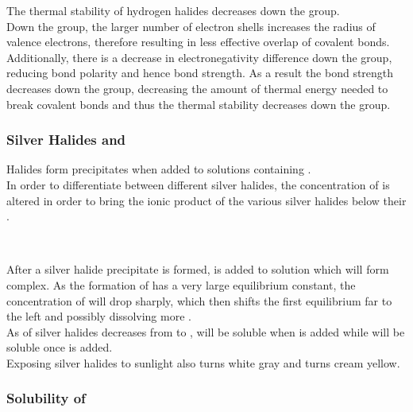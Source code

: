 \documentclass[../main]{subfiles}
\begin{document}
	The thermal stability of hydrogen halides decreases down the group. \\

	Down the group, the larger number of electron shells increases the radius of valence electrons, therefore resulting in less effective overlap of covalent bonds. Additionally, there is a decrease in electronegativity difference down the group, reducing bond polarity and hence bond strength. As a result the  bond strength decreases down the group, decreasing the amount of thermal energy needed to break covalent bonds and thus the thermal stability decreases down the group.

	\subsubsection{Silver Halides and }

	Halides form precipitates when added to solutions containing . \\

	In order to differentiate between different silver halides, the concentration of  is altered in order to bring the ionic product of the various silver halides below their . \\

	\begin{center}
		 \\
	\end{center}

	After a silver halide precipitate is formed,  is added to solution which will form \ch{[Ag(NH3)2]+} complex. As the formation of \ch{[Ag(NH3)2]+} has a very large equilibrium constant, the concentration of  will drop sharply, which then shifts the first equilibrium far to the left and possibly dissolving more . \\

	As  of silver halides decreases from  to ,  will be soluble when  is added while  will be soluble once  is added. \\

	Exposing silver halides to sunlight also turns white  gray and turns cream  yellow.

	\subsubsection{Solubility of }
\end{document}
